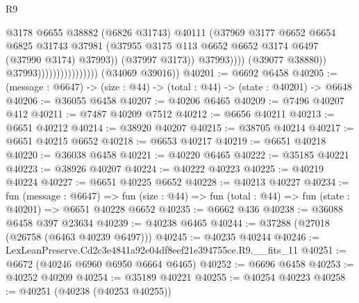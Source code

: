 \begin{lexlean}{R9}
\begin{coremodule}
                                                  @3178
                                                  @6655
                                                  @38882
                                                  (@6826 @31743)
                                                  @40111
                                                  (@37969
                                                    @3177
                                                    @6652
                                                    @6654
                                                    @6825
                                                    @31743
                                                    @37981
                                                    (@37955
                                                      @3175
                                                      @113
                                                      @6652
                                                      @6652
                                                      @3174
                                                      @6497
                                                      (@37990 @3174)
                                                      @37993))
                                                  (@37997 @3173))
                                                @37993))))
                                        (@39077 @38880))
                                      @37993))))))))))))))))
      (@34069 @39016))
@40201 := @6692 @6458
@40205 := (message : @6647) -> (size : @44) -> (total : @44) -> (state : @40201) -> @6648
@40206 := @36055 @6458
@40207 := @40206 @6465
@40209 := @7496 @40207 @412
@40211 := @7487 @40209 @7512
@40212 := @6656 @40211
@40213 := @6651 @40212
@40214 := @38920 @40207
@40215 := @38705 @40214
@40217 := @6651 @40215 @6652
@40218 := @6653 @40217
@40219 := @6651 @40218
@40220 := @36038 @6458
@40221 := @40220 @6465
@40222 := @35185 @40221
@40223 := @38926 @40207
@40224 := @40222 @40223
@40225 := @40219 @40224
@40227 := @6651 @40225 @6652
@40228 := @40213 @40227
@40234 := fun (message : @6647) =>
  fun (size : @44) => fun (total : @44) => fun (state : @40201) => @6651 @40228 @6652
@40235 := @6662 @436
@40238 := @36088 @6458 @397 @23634
@40239 := @40238 @6465
@40244 := @37288 (@27018 (@26758 (@6463 @40239 @6497)))
@40245 := @40235 @40244
@40246 := LexLeanPreserve.Cd2c3e4841a92e04df8eef21e394755ce.R9.__fits_11
@40251 := @6672 (@40246 @6960 @6950 @6664 @6465)
@40252 := @6696 @6458
@40253 := @40252 @40209
@40254 := @35189 @40221
@40255 := @40254 @40223
@40258 := @40251 (@40238 (@40253 @40255))

\end{coremodule}
\end{lexlean}
